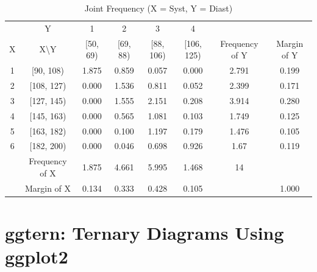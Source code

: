\documentclass[article]{jss}
\begin{document}
\begin{table}[htbp]
  \centering
  \caption{Joint Frequency (X = Syst, Y = Diast)}
    \begin{tabular}{rccccccc}
              & Y     & 1     & 2     & 3     & 4     &       &  \\
    \multicolumn{1}{c}{X} & X\textbackslash Y & [50, 69) & [69,   88) & [88, 106) & [106, 125) & Frequency of Y & Margin of Y \\
    \hline
    \multicolumn{1}{c}{1} & [90, 108) & 1.875  & 0.859  & 0.057  & 0.000  & 2.791 & 0.199  \\
    \multicolumn{1}{c}{2} & [108, 127) & 0.000  & 1.536  & 0.811  & 0.052  & 2.399 & 0.171  \\
    \multicolumn{1}{c}{3} & [127, 145) & 0.000  & 1.555  & 2.151  & 0.208  & 3.914 & 0.280  \\
    \multicolumn{1}{c}{4} & [145, 163) & 0.000  & 0.565  & 1.081  & 0.103  & 1.749 & 0.125  \\
    \multicolumn{1}{c}{5} & [163, 182) & 0.000  & 0.100  & 1.197  & 0.179  & 1.476 & 0.105  \\
    \multicolumn{1}{c}{6} & [182, 200) & 0.000  & 0.046  & 0.698  & 0.926  & 1.67  & 0.119  \\
          & Frequency of X & 1.875  & 4.661  & 5.995  & 1.468  & 14    &  \\
          & Margin of X & 0.134  & 0.333  & 0.428  & 0.105  &       & 1.000  \\
    \end{tabular}%
  \label{tab:demo_book}%
\end{table}%







\section*{ggtern: Ternary Diagrams Using ggplot2}



\end{document}

